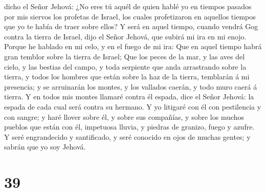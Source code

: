 dicho el Señor Jehová: ¿No eres tú aquél de quien hablé yo en tiempos
pasados por mis siervos los profetas de Israel, los cuales profetizaron
en aquellos tiempos que yo te había de traer sobre ellos? 
Y será en aquel tiempo, cuando vendrá Gog contra la tierra de Israel,
dijo el Señor Jehová, que subirá mi ira en mi enojo. 
Porque he hablado en mi celo, y en el fuego de mi ira: Que en aquel
tiempo habrá gran temblor sobre la tierra de Israel;  Que
los peces de la mar, y las aves del cielo, y las bestias del campo, y
toda serpiente que anda arrastrando sobre la tierra, y todos los hombres
que están sobre la haz de la tierra, temblarán á mi presencia; y se
arruinarán los montes, y los vallados caerán, y todo muro caerá á
tierra.  Y en todos mis montes llamaré contra él espada,
dice el Señor Jehová: la espada de cada cual será contra su hermano.
 Y yo litigaré con él con pestilencia y con sangre; y haré
llover sobre él, y sobre sus compañías, y sobre los muchos pueblos que
están con él, impetuosa lluvia, y piedras de granizo, fuego y azufre.
 Y seré engrandecido y santificado, y seré conocido en ojos
de muchas gentes; y sabrán que yo soy Jehová.

\hypertarget{section-38}{%
\section{39}\label{section-38}}

